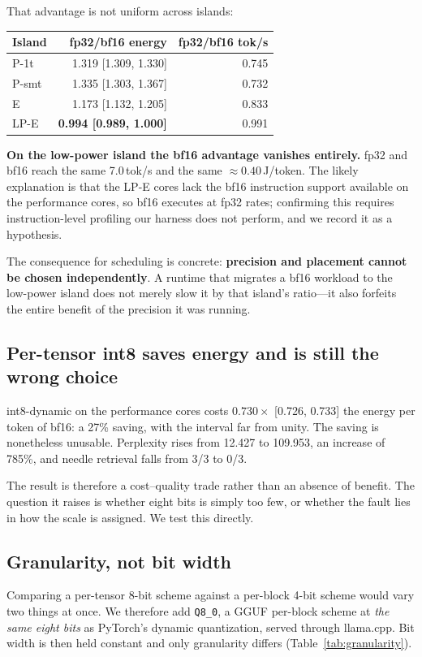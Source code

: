 \documentclass[journal]{IEEEtran}
\begin{document}
That advantage is not uniform across islands:

\begin{center}
\begin{tabular}{lrr}
\toprule
Island & fp32/bf16 energy & fp32/bf16 tok/s \\
\midrule
P-1t  & 1.319 [1.309, 1.330] & 0.745 \\
P-smt & 1.335 [1.303, 1.367] & 0.732 \\
E     & 1.173 [1.132, 1.205] & 0.833 \\
LP-E  & \textbf{0.994 [0.989, 1.000]} & 0.991 \\
\bottomrule
\end{tabular}
\end{center}

\textbf{On the low-power island the bf16 advantage vanishes entirely.} fp32 and
bf16 reach the same 7.0\,tok/s and the same ${\approx}0.40$\,J/token. The
likely explanation is that the LP-E cores lack the bf16 instruction support
available on the performance cores, so bf16 executes at fp32 rates; confirming
this requires instruction-level profiling our harness does not perform, and we
record it as a hypothesis.

The consequence for scheduling is concrete: \textbf{precision and placement
cannot be chosen independently}. A runtime that migrates a bf16 workload to the
low-power island does not merely slow it by that island's ratio---it also
forfeits the entire benefit of the precision it was running.

\subsection{Per-tensor int8 saves energy and is still the wrong choice}
\label{sec:int8}
int8-dynamic on the performance cores costs $0.730\times$ [0.726, 0.733] the
energy per token of bf16: a 27\% saving, with the interval far from unity. The
saving is nonetheless unusable. Perplexity rises from 12.427 to 109.953, an
increase of 785\%, and needle retrieval falls from 3/3 to 0/3.

The result is therefore a cost--quality trade rather than an absence of
benefit. The question it raises is whether eight bits is simply too few, or
whether the fault lies in how the scale is assigned. We test this directly.

\subsection{Granularity, not bit width}
\label{sec:granularity}
Comparing a per-tensor 8-bit scheme against a per-block 4-bit scheme would vary
two things at once. We therefore add \texttt{Q8\_0}, a GGUF per-block scheme at
\emph{the same eight bits} as PyTorch's dynamic quantization, served through
llama.cpp. Bit width is then held constant and only granularity differs
(Table~\ref{tab:granularity}).
\end{document}
